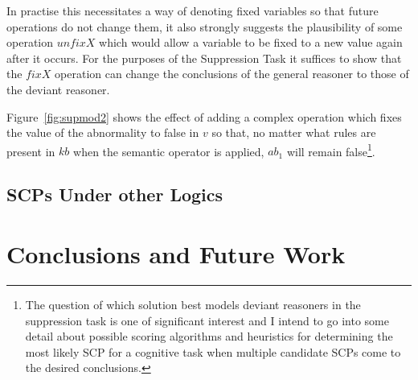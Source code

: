 \documentclass{article}
\begin{document}
In practise this necessitates a way of denoting fixed variables so that future operations do not change them, it also strongly suggests the plausibility of some operation $unfixX$ which would allow a variable to be fixed to a new value again after it occurs. For the purposes of the Suppression Task it suffices to show that the $fixX$ operation can change the conclusions of the general reasoner to those of the deviant reasoner.

Figure~\ref{fig:supmod2} shows the effect of adding a complex operation which fixes the value of the abnormality to false in $v$ so that, no matter what rules are present in $kb$ when the semantic operator is applied, $ab_1$ will remain false\footnote{The question of which solution best models deviant reasoners in the suppression task is one of significant interest and I intend to go into some detail about possible scoring algorithms and heuristics for determining the most likely SCP for a cognitive task when multiple candidate SCPs come to the desired conclusions.}.
\subsection{SCPs Under other Logics}
\section{Conclusions and Future Work}
\end{document}
